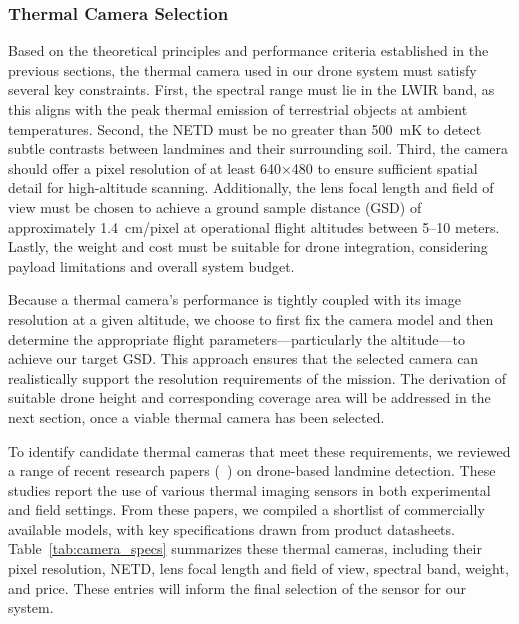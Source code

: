 \subsubsection{Thermal Camera Selection}

Based on the theoretical principles and performance criteria established in the previous sections, the thermal camera used in our drone system must satisfy several key constraints. First, the spectral range must lie in the LWIR band, as this aligns with the peak thermal emission of terrestrial objects at ambient temperatures. Second, the NETD must be no greater than 500~mK to detect subtle contrasts between landmines and their surrounding soil. Third, the camera should offer a pixel resolution of at least 640×480 to ensure sufficient spatial detail for high-altitude scanning. Additionally, the lens focal length and field of view must be chosen to achieve a ground sample distance (GSD) of approximately 1.4~cm/pixel at operational flight altitudes between 5–10 meters. Lastly, the weight and cost must be suitable for drone integration, considering payload limitations and overall system budget.

Because a thermal camera's performance is tightly coupled with its image resolution at a given altitude, we choose to first fix the camera model and then determine the appropriate flight parameters—particularly the altitude—to achieve our target GSD. This approach ensures that the selected camera can realistically support the resolution requirements of the mission. The derivation of suitable drone height and corresponding coverage area will be addressed in the next section, once a viable thermal camera has been selected.

To identify candidate thermal cameras that meet these requirements, we reviewed a range of recent research papers (~\cite{baur2020applying,nikulin2018detection,krause2018diurnal,TENORIOTAMAYO2024105567,FORERORAMIREZ2022104307,rs15040967,dena2020image,Fardoulis2020PROOFHS,butt2024uav,AgrawalChung2024ComparingSL,Popov2022MethodFM,TENORIOTAMAYO2023109443}) on drone-based landmine detection. These studies report the use of various thermal imaging sensors in both experimental and field settings. From these papers, we compiled a shortlist of commercially available models, with key specifications drawn from product datasheets. Table~\ref{tab:camera_specs} summarizes these thermal cameras, including their pixel resolution, NETD, lens focal length and field of view, spectral band, weight, and price. These entries will inform the final selection of the sensor for our system.

